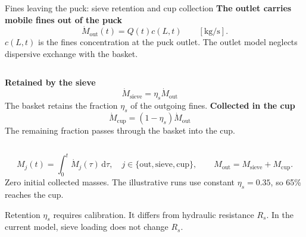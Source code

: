 \documentclass[aspectratio=169,11pt]{beamer}
\newcommand{\hi}[1]{\textcolor{tumblue}{\textbf{#1}}}
\newcommand{\slidesource}[1]{\par\vfill{\tiny\color{tumgray}#1}}
\begin{document}
\begin{frame}{Fines leaving the puck: sieve retention and cup collection}
\small
\hi{The outlet carries mobile fines out of the puck}
\[
\dot M_{\mathrm{out}}(t)=Q(t)c(L,t)\qquad [\mathrm{kg/s}].
\]
$c(L,t)$ is the fines concentration at the puck outlet.
The outlet model neglects dispersive exchange with the basket.
\par\medskip
\begin{columns}[T,onlytextwidth]
\hi{Retained by the sieve}
\[
\dot M_{\mathrm{sieve}}=\eta_s\dot M_{\mathrm{out}}
\]
The basket retains the fraction $\eta_s$ of the outgoing fines.
\hi{Collected in the cup}
\[
\dot M_{\mathrm{cup}}=(1-\eta_s)\dot M_{\mathrm{out}}
\]
The remaining fraction passes through the basket into the cup.
\end{columns}
\[
M_j(t)=\int_0^t\dot M_j(\tau)\,\mathrm d\tau,\quad
j\in\{\mathrm{out},\mathrm{sieve},\mathrm{cup}\},\qquad
M_{\mathrm{out}}=M_{\mathrm{sieve}}+M_{\mathrm{cup}}.
\]
\small Zero initial collected masses. The illustrative runs use constant
$\eta_s=0.35$, so 65\% reaches the cup.
\slidesource{Retention $\eta_s$ requires calibration. It differs from hydraulic resistance $R_s$.
In the current model, sieve loading does not change $R_s$.}
\end{frame}
\end{document}

